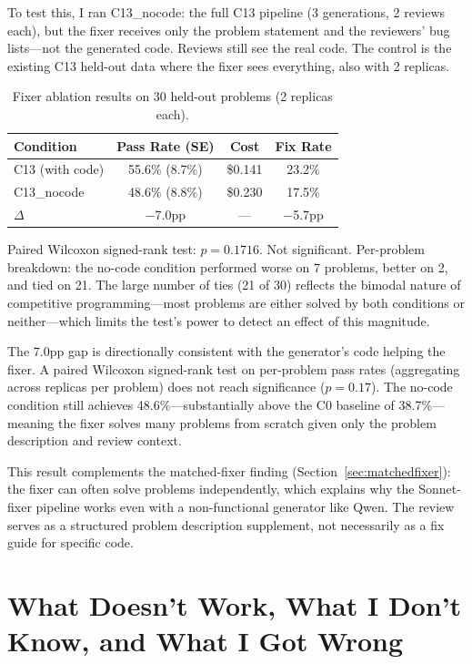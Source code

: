 \documentclass{article}
\begin{document}
To test this, I ran C13\_nocode: the full C13 pipeline (3 generations, 2 reviews each), but the fixer receives only the problem statement and the reviewers' bug lists---not the generated code. Reviews still see the real code. The control is the existing C13 held-out data where the fixer sees everything, also with 2 replicas.

\begin{table}[t]
\centering
\caption{Fixer ablation results on 30 held-out problems (2 replicas each).}
\label{tab:fixer}
\small
\begin{tabular}{lccc}
\toprule
Condition & Pass Rate (SE) & Cost & Fix Rate \\
\midrule
C13 (with code) & 55.6\% (8.7\%) & \$0.141 & 23.2\% \\
C13\_nocode      & 48.6\% (8.8\%) & \$0.230 & 17.5\% \\
$\Delta$         & $-$7.0pp       & ---     & $-$5.7pp \\
\bottomrule
\end{tabular}
\end{table}

Paired Wilcoxon signed-rank test: $p=0.1716$. Not significant. Per-problem breakdown: the no-code condition performed worse on 7 problems, better on 2, and tied on 21. The large number of ties (21 of 30) reflects the bimodal nature of competitive programming---most problems are either solved by both conditions or neither---which limits the test's power to detect an effect of this magnitude.

The 7.0pp gap is directionally consistent with the generator's code helping the fixer. A paired Wilcoxon signed-rank test on per-problem pass rates (aggregating across replicas per problem) does not reach significance ($p=0.17$). The no-code condition still achieves 48.6\%---substantially above the C0 baseline of 38.7\%---meaning the fixer solves many problems from scratch given only the problem description and review context.

This result complements the matched-fixer finding (Section~\ref{sec:matchedfixer}): the fixer can often solve problems independently, which explains why the Sonnet-fixer pipeline works even with a non-functional generator like Qwen. The review serves as a structured problem description supplement, not necessarily as a fix guide for specific code.

\section{What Doesn't Work, What I Don't Know, and What I Got Wrong}
\label{sec:limitations}
\end{document}

